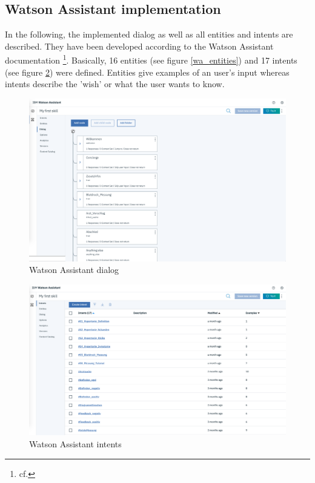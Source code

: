 \subsection{Watson Assistant implementation}
In the following, the implemented dialog as well as all entities and intents are described. They have been developed according to the Watson Assistant documentation \footnote{cf.\autocite{wa_docu}}.
Basically, 16 entities (see figure \ref{wa_entities}) and 17 intents (see figure \ref{wa_intents}) were defined. Entities give examples of an user's input whereas intents describe the 'wish' or what the user wants to know.
\begin{figure}[ht]
	\centering
	\includegraphics[width=1\textwidth]{images/WA_dialog.png}
	\caption{Watson Assistant dialog}
	\label{wa_dialog}
\end{figure}

\begin{figure}[ht]
	\centering
	\includegraphics[width=1\textwidth]{images/WA_intents.png}
	\caption{Watson Assistant intents}
	\label{wa_intents}
\end{figure}

